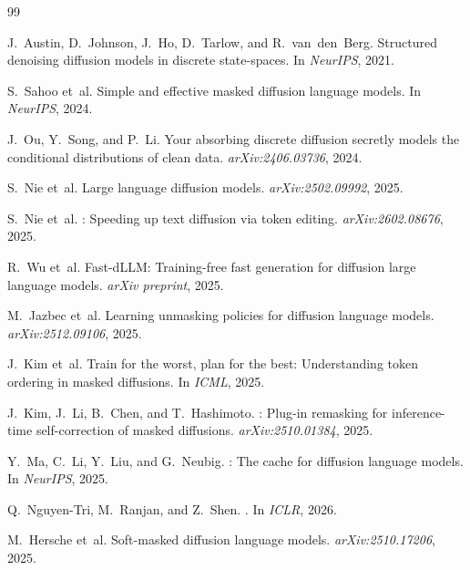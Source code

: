 \documentclass[11pt]{article}
\begin{document}


\begin{thebibliography}{99}

J.~Austin, D.~Johnson, J.~Ho, D.~Tarlow, and R.~van~den~Berg.
\newblock Structured denoising diffusion models in discrete state-spaces.
\newblock In \emph{NeurIPS}, 2021.

S.~Sahoo et~al.
\newblock Simple and effective masked diffusion language models.
\newblock In \emph{NeurIPS}, 2024.

J.~Ou, Y.~Song, and P.~Li.
\newblock Your absorbing discrete diffusion secretly models the conditional distributions of clean data.
\newblock \emph{arXiv:2406.03736}, 2024.

S.~Nie et~al.
\newblock Large language diffusion models.
\newblock \emph{arXiv:2502.09992}, 2025.

S.~Nie et~al.
: Speeding up text diffusion via token editing.
\newblock \emph{arXiv:2602.08676}, 2025.

R.~Wu et~al.
\newblock Fast-{dLLM}: Training-free fast generation for diffusion large language models.
\newblock \emph{arXiv preprint}, 2025.

M.~Jazbec et~al.
\newblock Learning unmasking policies for diffusion language models.
\newblock \emph{arXiv:2512.09106}, 2025.

J.~Kim et~al.
\newblock Train for the worst, plan for the best: Understanding token ordering in masked diffusions.
\newblock In \emph{ICML}, 2025.

J.~Kim, J.~Li, B.~Chen, and T.~Hashimoto.
: Plug-in remasking for inference-time self-correction of masked diffusions.
\newblock \emph{arXiv:2510.01384}, 2025.

Y.~Ma, C.~Li, Y.~Liu, and G.~Neubig.
: The cache for diffusion language models.
\newblock In \emph{NeurIPS}, 2025.

Q.~Nguyen-Tri, M.~Ranjan, and Z.~Shen.
.
\newblock In \emph{ICLR}, 2026.

M.~Hersche et~al.
\newblock Soft-masked diffusion language models.
\newblock \emph{arXiv:2510.17206}, 2025.


\end{thebibliography}
\end{document}
